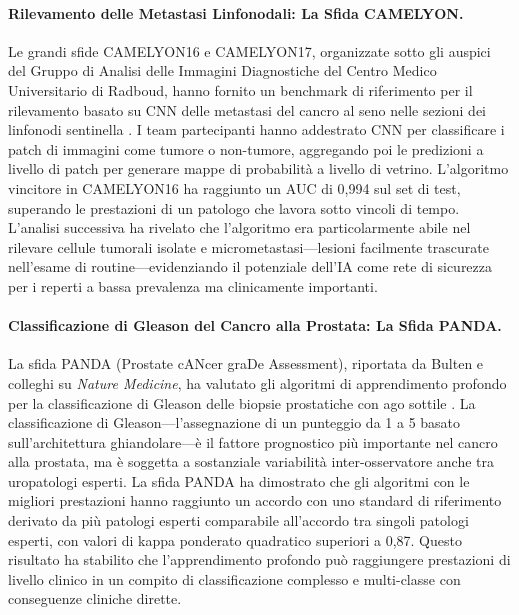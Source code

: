 \paragraph{Rilevamento delle Metastasi Linfonodali: La Sfida CAMELYON.}
Le grandi sfide CAMELYON16 e CAMELYON17, organizzate sotto gli auspici del Gruppo di Analisi delle Immagini Diagnostiche del Centro Medico Universitario di Radboud, hanno fornito un benchmark di riferimento per il rilevamento basato su CNN delle metastasi del cancro al seno nelle sezioni dei linfonodi sentinella \cite{ehteshami2017}. I team partecipanti hanno addestrato CNN per classificare i patch di immagini come tumore o non-tumore, aggregando poi le predizioni a livello di patch per generare mappe di probabilità a livello di vetrino. L'algoritmo vincitore in CAMELYON16 ha raggiunto un AUC di 0,994 sul set di test, superando le prestazioni di un patologo che lavora sotto vincoli di tempo. L'analisi successiva ha rivelato che l'algoritmo era particolarmente abile nel rilevare cellule tumorali isolate e micrometastasi---lesioni facilmente trascurate nell'esame di routine---evidenziando il potenziale dell'IA come rete di sicurezza per i reperti a bassa prevalenza ma clinicamente importanti.

\paragraph{Classificazione di Gleason del Cancro alla Prostata: La Sfida PANDA.}
La sfida PANDA (Prostate cANcer graDe Assessment), riportata da Bulten e colleghi su \emph{Nature Medicine}, ha valutato gli algoritmi di apprendimento profondo per la classificazione di Gleason delle biopsie prostatiche con ago sottile \cite{bulten2022}. La classificazione di Gleason---l'assegnazione di un punteggio da 1 a 5 basato sull'architettura ghiandolare---è il fattore prognostico più importante nel cancro alla prostata, ma è soggetta a sostanziale variabilità inter-osservatore anche tra uropatologi esperti. La sfida PANDA ha dimostrato che gli algoritmi con le migliori prestazioni hanno raggiunto un accordo con uno standard di riferimento derivato da più patologi esperti comparabile all'accordo tra singoli patologi esperti, con valori di kappa ponderato quadratico superiori a 0,87. Questo risultato ha stabilito che l'apprendimento profondo può raggiungere prestazioni di livello clinico in un compito di classificazione complesso e multi-classe con conseguenze cliniche dirette.

